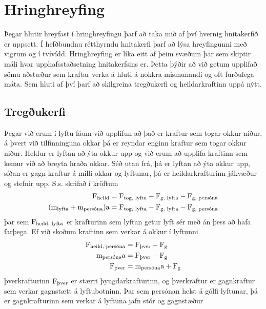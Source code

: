 \chapter{Hringhreyfing}
Þegar hlutir hreyfast í hringhreyfingu þarf að taka mið af því hvernig hnitakerfið er
uppsett. Í hefðbundnu rétthyrndu hnitakerfi þarf að lýsa hreyfingunni með vigrum
og í tvívídd. Hringhreyfing er líka eitt af þeim svæðum þar sem skiptir máli
hvar upphafsstaðsetning hnitakerfsins er. Þetta þýðir að við getum upplifað
sömu aðstæður sem kraftar verka á hluti á nokkra mismunandi og oft furðulega
máta. Sem hluti af því þarf að skilgreina tregðukerfi og heildarkraftinn
uppá nýtt.

\section{Tregðukerfi}
Þegar við erum í lyftu fáum við upplifun að það er kraftur sem togar okkur
niður, á þvert við tilfinninguna okkar þá er reyndar enginn kraftur sem togar
okkur niður. Heldur er lyftan að ýta okkur upp og við erum að upplifa kraftinn
sem kemur við að breyta hraða okkar. Séð utan frá, þá er lyftan að ýta okkur
upp, síðan er gagn kraftur á milli okkar og lyftunar, þá er heildarkrafturinn
jákvæður og stefnir upp. S.s. skrifað í kröftum
\begin{align*}
	\textrm{F}_\text{heild} 
		&= \textrm{F}_\text{tog, lyfta} - \textrm{F}_\text{g, lyfta} - \textrm{F}_\text{g, persóna}\\
	(\textrm{m}_\text{lyfta} + \textrm{m}_\text{persóna}) \textrm{a}
		&= \textrm{F}_\text{tog, lyfta} - \textrm{F}_\text{g, lyfta} - \textrm{F}_\text{g, persóna}\\
\end{align*}
þar sem $\textrm{F}_\text{heild, lyfta}$ er krafturinn sem lyftan getur lyft sér með
án þess að hafa farþega. Ef við skoðum kraftinn sem verkar á okkur í lyftunni
\begin{align*}
	\textrm{F}_\text{heild, persóna}
		&= \textrm{F}_\text{þver} - \textrm{F}_\text{g} \\
	\textrm{m}_\text{persóna} \textrm{a}
		&= \textrm{F}_\text{þver} - \textrm{F}_\text{g} \\
	\textrm{F}_\text{þver}
		&= \textrm{m}_\text{persóna} \textrm{a} + \textrm{F}_\text{g} \\
\end{align*}
þverkrafturinn $\textrm{F}_\text{þver}$ er stærri þyngdarkrafturinn, og þverkraftur
er gagnkraftur sem verkar gagnstætt á lyftubotninn. Þar sem persónan helst á
gólfi lyftunar, þá er gagnkrafturinn sem verkar á lyftuna jafn stór og gagnstæður

